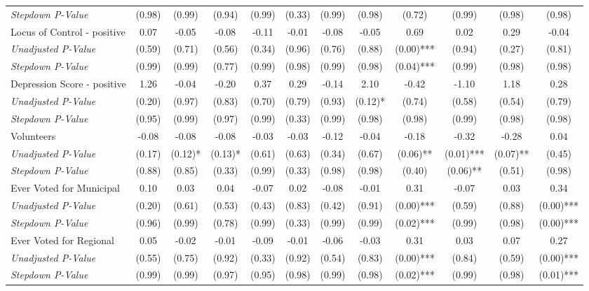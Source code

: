 \begin{tabular}{l c c c c c c c c c c c}
\quad \textit{Stepdown P-Value} & (0.98) & (0.99) & (0.94) & (0.99) & (0.33) & (0.99) & (0.98) & (0.72) & (0.99) & (0.98) & (0.98) \\
Locus of Control - positive & 0.07 & -0.05 & -0.08 & -0.11 & -0.01 & -0.08 & -0.05 & 0.69 & 0.02 & 0.29 & -0.04 \\
\quad \textit{Unadjusted P-Value} & (0.59) & (0.71) & (0.56) & (0.34) & (0.96) & (0.76) & (0.88) & (0.00)*** & (0.94) & (0.27) & (0.81) \\
\quad \textit{Stepdown P-Value} & (0.99) & (0.99) & (0.77) & (0.99) & (0.98) & (0.99) & (0.98) & (0.04)*** & (0.99) & (0.98) & (0.98) \\
Depression Score - positive & 1.26 & -0.04 & -0.20 & 0.37 & 0.29 & -0.14 & 2.10 & -0.42 & -1.10 & 1.18 & 0.28 \\
\quad \textit{Unadjusted P-Value} & (0.20) & (0.97) & (0.83) & (0.70) & (0.79) & (0.93) & (0.12)* & (0.74) & (0.58) & (0.54) & (0.79) \\
\quad \textit{Stepdown P-Value} & (0.95) & (0.99) & (0.97) & (0.99) & (0.33) & (0.99) & (0.98) & (0.98) & (0.99) & (0.98) & (0.98) \\
Volunteers & -0.08 & -0.08 & -0.08 & -0.03 & -0.03 & -0.12 & -0.04 & -0.18 & -0.32 & -0.28 & 0.04 \\
\quad \textit{Unadjusted P-Value} & (0.17) & (0.12)* & (0.13)* & (0.61) & (0.63) & (0.34) & (0.67) & (0.06)** & (0.01)*** & (0.07)** & (0.45) \\
\quad \textit{Stepdown P-Value} & (0.88) & (0.85) & (0.33) & (0.99) & (0.33) & (0.98) & (0.98) & (0.40) & (0.06)** & (0.51) & (0.98) \\
Ever Voted for Municipal & 0.10 & 0.03 & 0.04 & -0.07 & 0.02 & -0.08 & -0.01 & 0.31 & -0.07 & 0.03 & 0.34 \\
\quad \textit{Unadjusted P-Value} & (0.20) & (0.61) & (0.53) & (0.43) & (0.83) & (0.42) & (0.91) & (0.00)*** & (0.59) & (0.88) & (0.00)*** \\
\quad \textit{Stepdown P-Value} & (0.96) & (0.99) & (0.78) & (0.99) & (0.33) & (0.99) & (0.99) & (0.02)*** & (0.99) & (0.98) & (0.00)*** \\
Ever Voted for Regional & 0.05 & -0.02 & -0.01 & -0.09 & -0.01 & -0.06 & -0.03 & 0.31 & 0.03 & 0.07 & 0.27 \\
\quad \textit{Unadjusted P-Value} & (0.55) & (0.75) & (0.92) & (0.33) & (0.92) & (0.54) & (0.83) & (0.00)*** & (0.84) & (0.59) & (0.00)*** \\
\quad \textit{Stepdown P-Value} & (0.99) & (0.99) & (0.97) & (0.95) & (0.98) & (0.99) & (0.98) & (0.02)*** & (0.99) & (0.98) & (0.01)*** \\

\end{tabular}
